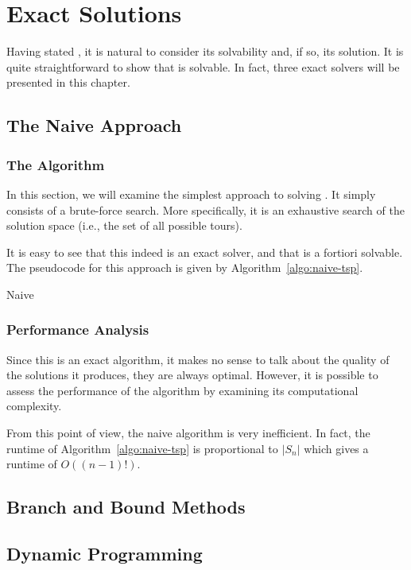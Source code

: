 \chapter{Exact Solutions}

Having stated \TSP, it is natural to consider its solvability and, if so, its solution. It is quite straightforward to show that \TSP{} is solvable. In fact, three exact solvers will be presented in this chapter.

\section{The Naive Approach}

\subsection{The Algorithm}

    In this section, we will examine the simplest approach to solving \TSP. It simply consists of a brute-force search. More specifically, it is an exhaustive search of the solution space (i.e., the set of all possible tours).

    It is easy to see that this indeed is an exact solver, and that \TSP{} is a fortiori solvable. The pseudocode for this approach is given by Algorithm~\ref{algo:naive-tsp}.

    \begin{algorithm}
        \caption{Naive \TSP}
        \label{algo:naive-tsp}

    \end{algorithm}

\subsection{Performance Analysis}

Since this is an exact algorithm, it makes no sense to talk about the quality of the solutions it produces, they are always optimal. However, it is possible to assess the performance of the algorithm by examining its computational complexity.

From this point of view, the naive algorithm is very inefficient. In fact, the runtime of Algorithm~\ref{algo:naive-tsp} is proportional to \(|S_n|\) which gives a runtime of \(O\left((n-1)!\right)\).


\section{Branch and Bound Methods}

\section{Dynamic Programming}